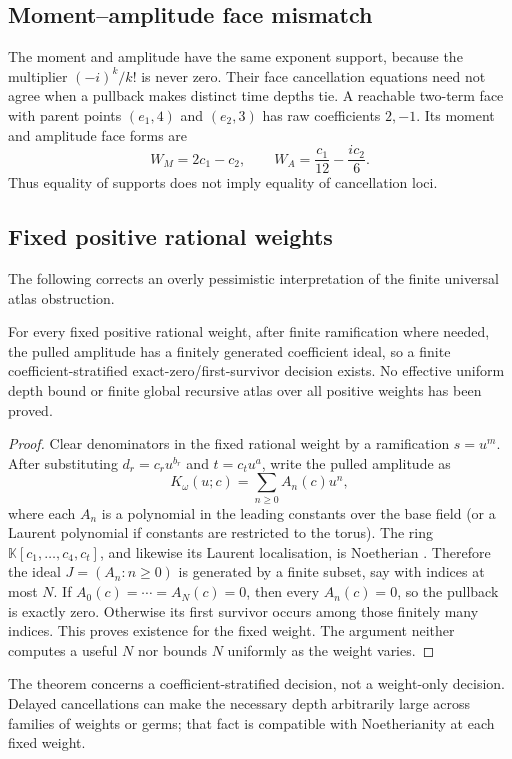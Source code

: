 \subsection{Moment--amplitude face mismatch}

The moment and amplitude have the same exponent support, because the multiplier
\((-i)^k/k!\) is never zero.  Their face cancellation equations need not agree
when a pullback makes distinct time depths tie.  A reachable two-term face with
parent points \((e_1,4)\) and \((e_2,3)\) has raw coefficients \(2,-1\).  Its
moment and amplitude face forms are
\[
W_M=2c_1-c_2,\qquad W_A=\frac{c_1}{12}-\frac{i c_2}{6}.
\]
Thus equality of supports does not imply equality of cancellation loci.

\subsection{Fixed positive rational weights}

The following corrects an overly pessimistic interpretation of the finite
universal atlas obstruction.

\begin{theorem}\label{thm:noetherian}
For every fixed positive rational weight, after finite ramification where
needed, the pulled amplitude has a finitely generated coefficient ideal, so a
finite coefficient-stratified exact-zero/first-survivor decision exists.  No
effective uniform depth bound or finite global recursive atlas over all
positive weights has been proved.
\end{theorem}
\begin{proof}
Clear denominators in the fixed rational weight by a ramification \(s=u^m\).
After substituting
\(d_r=c_ru^{b_r}\) and \(t=c_tu^a\), write the pulled amplitude as
\[
K_\omega(u;c)=\sum_{n\ge0}A_n(c)u^n,
\]
where each \(A_n\) is a polynomial in the leading constants over the base field
(or a Laurent polynomial if constants are restricted to the torus).  The ring
\(\mathbb K[c_1,\ldots,c_4,c_t]\), and likewise its Laurent localisation, is
Noetherian \parencite{AtiyahMacdonald1969}.  Therefore the ideal
\(J=(A_n:n\ge0)\) is generated by a finite subset, say with indices at most
\(N\).  If \(A_0(c)=\cdots=A_N(c)=0\), then every \(A_n(c)=0\), so the pullback
is exactly zero.  Otherwise its first survivor occurs among those finitely many
indices.  This proves existence for the fixed weight.  The argument neither
computes a useful \(N\) nor bounds \(N\) uniformly as the weight varies.
\end{proof}

The theorem concerns a coefficient-stratified decision, not a weight-only
decision.  Delayed cancellations can make the necessary depth arbitrarily
large across families of weights or germs; that fact is compatible with
Noetherianity at each fixed weight.
